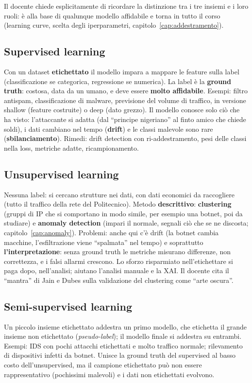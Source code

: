 \begin{esame}
Il docente chiede esplicitamente di ricordare la distinzione tra i tre insiemi e i loro ruoli: è
alla base di qualunque modello affidabile e torna in tutto il corso (learning curve, scelta degli
iperparametri, capitolo~\ref{cap:addestramento}).
\end{esame}

\subsection{Supervised learning}
Con un dataset \textbf{etichettato} il modello impara a mappare le feature sulla label (classificazione
se categorica, regressione se numerica). La label è la \textbf{ground truth}: costosa, data da un umano,
e deve essere \textbf{molto affidabile}. Esempi: filtro antispam, classificazione di malware,
previsione del volume di traffico, in versione shallow (feature costruite) o deep (dato grezzo). Il
modello conosce solo ciò che ha visto: l'attaccante si adatta (dal ``principe nigeriano'' al finto
amico che chiede soldi), i dati cambiano nel tempo (\textbf{drift}) e le classi malevole sono rare
(\textbf{sbilanciamento}). Rimedi: drift detection con ri-addestramento, pesi delle classi nella loss,
metriche adatte, ricampionamento.

\subsection{Unsupervised learning}
Nessuna label: si cercano strutture nei dati, con dati economici da raccogliere (tutto il traffico
della rete del Politecnico). Metodo \textbf{descrittivo}: \textbf{clustering} (gruppi di IP che si
comportano in modo simile, per esempio una botnet, poi da studiare) e \textbf{anomaly detection}
(impari il normale, segnali ciò che se ne discosta; capitolo~\ref{cap:anomaly}). Problemi: anche qui
c'è drift (la botnet cambia macchine, l'esfiltrazione viene ``spalmata'' nel tempo) e soprattutto
\textbf{l'interpretazione}: senza ground truth le metriche misurano differenze, non correttezza, e i
falsi allarmi crescono. Lo sforzo risparmiato nell'etichettare si paga dopo, nell'analisi; aiutano
l'analisi manuale e la XAI. Il docente cita il ``mantra'' di Jain e Dubes sulla validazione del
clustering come ``arte oscura''.

\subsection{Semi-supervised learning}
Un piccolo insieme etichettato addestra un primo modello, che etichetta il grande insieme non
etichettato (\emph{pseudo-label}); il modello finale si addestra su entrambi. Esempi: IDS con pochi
attacchi etichettati e molto traffico normale; rilevamento di dispositivi infetti da botnet. Unisce la
ground truth del supervised al basso costo dell'unsupervised, ma il campione etichettato può non
essere rappresentativo (pochissimi malevoli) e i dati non etichettati evolvono.

